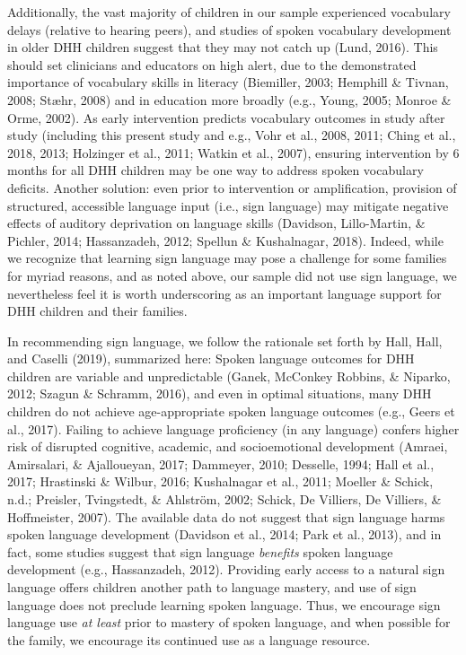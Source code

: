 \documentclass[english,man]{apa6}
\begin{document}
Additionally, the vast majority of children in our sample experienced vocabulary delays (relative to hearing peers), and studies of spoken vocabulary development in older DHH children suggest that they may not catch up (Lund, 2016). This should set clinicians and educators on high alert, due to the demonstrated importance of vocabulary skills in literacy (Biemiller, 2003; Hemphill \& Tivnan, 2008; Stæhr, 2008) and in education more broadly (e.g., Young, 2005; Monroe \& Orme, 2002). As early intervention predicts vocabulary outcomes in study after study (including this present study and e.g., Vohr et al., 2008, 2011; Ching et al., 2018, 2013; Holzinger et al., 2011; Watkin et al., 2007), ensuring intervention by 6 months for all DHH children may be one way to address spoken vocabulary deficits. Another solution: even prior to intervention or amplification, provision of structured, accessible language input (i.e., sign language) may mitigate negative effects of auditory deprivation on language skills (Davidson, Lillo-Martin, \& Pichler, 2014; Hassanzadeh, 2012; Spellun \& Kushalnagar, 2018). Indeed, while we recognize that learning sign language may pose a challenge for some families for myriad reasons, and as noted above, our sample did not use sign language, we nevertheless feel it is worth underscoring as an important language support for DHH children and their families.

In recommending sign language, we follow the rationale set forth by Hall, Hall, and Caselli (2019), summarized here: Spoken language outcomes for DHH children are variable and unpredictable (Ganek, McConkey Robbins, \& Niparko, 2012; Szagun \& Schramm, 2016), and even in optimal situations, many DHH children do not achieve age-appropriate spoken language outcomes (e.g., Geers et al., 2017). Failing to achieve language proficiency (in any language) confers higher risk of disrupted cognitive, academic, and socioemotional development (Amraei, Amirsalari, \& Ajalloueyan, 2017; Dammeyer, 2010; Desselle, 1994; Hall et al., 2017; Hrastinski \& Wilbur, 2016; Kushalnagar et al., 2011; Moeller \& Schick, n.d.; Preisler, Tvingstedt, \& Ahlström, 2002; Schick, De Villiers, De Villiers, \& Hoffmeister, 2007). The available data do not suggest that sign language harms spoken language development (Davidson et al., 2014; Park et al., 2013), and in fact, some studies suggest that sign language \emph{benefits} spoken language development (e.g., Hassanzadeh, 2012). Providing early access to a natural sign language offers children another path to language mastery, and use of sign language does not preclude learning spoken language. Thus, we encourage sign language use \emph{at least} prior to mastery of spoken language, and when possible for the family, we encourage its continued use as a language resource.
\end{document}
